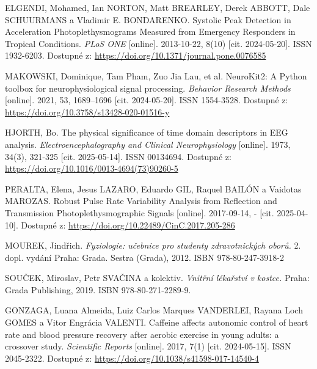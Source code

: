 \begin{thebibliography}{99}
		ELGENDI, Mohamed, Ian NORTON, Matt BREARLEY, Derek ABBOTT, Dale SCHUURMANS a Vladimir E. BONDARENKO.
		Systolic Peak Detection in Acceleration Photoplethysmograms Measured from Emergency Responders in Tropical Conditions.
		\emph{PLoS ONE} [online].
		2013-10-22, 8(10) [cit. 2024-05-20].
		ISSN 1932-6203.
		Dostupné z: \url{https://doi.org/10.1371/journal.pone.0076585}

		MAKOWSKI, Dominique, Tam Pham, Zuo Jia Lau, et al.
		NeuroKit2: A Python toolbox for neurophysiological signal processing.
		\emph{Behavior Research Methods} [online].
		2021, 53, 1689–1696 [cit. 2024-05-20].
		ISSN 1554-3528.
		Dostupné z: \url{https://doi.org/10.3758/s13428-020-01516-y}

		HJORTH, Bo.
		The physical significance of time domain descriptors in EEG analysis.
		\emph{Electroencephalography and Clinical Neurophysiology} [online].
		1973, 34(3), 321-325 [cit. 2025-05-14].
		ISSN 00134694.
		Dostupné z: \url{https://doi.org/10.1016/0013-4694(73)90260-5}

		PERALTA, Elena, Jesus LAZARO, Eduardo GIL, Raquel BAILÓN a Vaidotas MAROZAS.
		Robust Pulse Rate Variability Analysis from Reflection and Transmission Photoplethysmographic Signals [online].
		2017-09-14, - [cit. 2025-04-10].
		Dostupné z: \url{https://doi.org/10.22489/CinC.2017.205-286}

		MOUREK, Jindřich.
		\emph{Fyziologie: učebnice pro studenty zdravotnických oborů.}
		2.\, dopl. vydání Praha: Grada. Sestra (Grada), 2012.
		ISBN 978-80-247-3918-2

		SOUČEK, Miroslav, Petr SVAČINA a kolektiv.
		\emph{Vnitřní lékařství v kostce.}
		Praha: Grada Publishing, 2019.
		ISBN 978-80-271-2289-9.

		GONZAGA, Luana Almeida, Luiz Carlos Marques VANDERLEI, Rayana Loch GOMES a Vitor Engrácia VALENTI.
		Caffeine affects autonomic control of heart rate and blood pressure recovery after aerobic exercise in young adults: a crossover study.
		\emph{Scientific Reports} [online].
		2017, 7(1) [cit. 2024-05-15].
		ISSN 2045-2322.
		Dostupné z: \url{https://doi.org/10.1038/s41598-017-14540-4}


\end{thebibliography}
